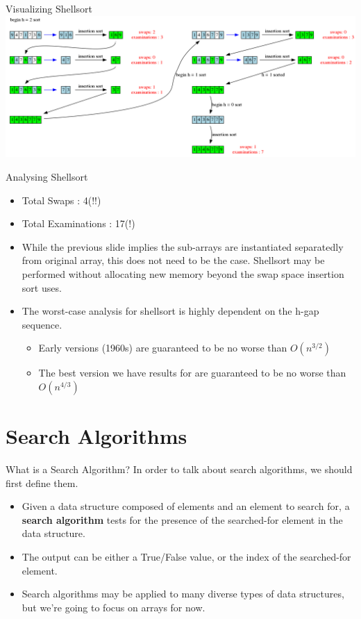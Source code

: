 \documentclass[11pt]{beamer}
\begin{document}
\begin{frame}{Visualizing Shellsort}
\center
\includegraphics[scale=0.25]{graphs/shellsort.png}
\end{frame}

\begin{frame}{Analysing Shellsort}
\begin{itemize}
\item Total Swaps : 4(!!) 
\item Total Examinations : 17(!)
\item While the previous slide implies the sub-arrays are instantiated separatedly from original array, this does not need to be the case.  Shellsort may be performed without allocating new memory beyond the swap space insertion sort uses.  
\item The worst-case analysis for shellsort is highly dependent on the h-gap sequence. 
\begin{itemize}
\item Early versions (1960s) are guaranteed to be no worse than $O(n^{3/2})$
\item The best version we have results for are guaranteed to be no worse than $O(n^{4/3})$
\end{itemize}
\end{itemize}
\end{frame}

\section[Search]{Search Algorithms}
\begin{frame}{What is a Search Algorithm?}
In order to talk about search algorithms, we should first define them.  
\begin{itemize}
\item Given a data structure composed of elements and an element to search for, a \textbf{search algorithm} tests for the presence of the searched-for element in the data structure.
\item The output can be either a True/False value, or the index of the searched-for element.
\item Search algorithms may be applied to many diverse types of data structures, but we're going to focus on arrays for now.
\end{itemize}
\end{frame}
\end{document}
